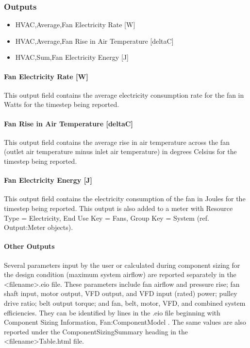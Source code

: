 \subsubsection{Outputs}\label{outputs-4-005}

\begin{itemize}
\item
  HVAC,Average,Fan Electricity Rate {[}W{]}
\item
  HVAC,Average,Fan Rise in Air Temperature {[}deltaC{]}
\item
  HVAC,Sum,Fan Electricity Energy {[}J{]}
\end{itemize}

\paragraph{Fan Electricity Rate {[}W{]}}\label{fan-electric-power-w-4}

This output field contains the average electricity consumption rate for the fan in Watts for the timestep being reported.

\paragraph{Fan Rise in Air Temperature {[}deltaC{]}}\label{fan-rise-in-air-temperature-deltac-4}

This output field contains the average rise in air temperature across the fan (outlet air temperature minus inlet air temperature) in degrees Celsius for the timestep being reported.

\paragraph{Fan Electricity Energy {[}J{]}}\label{fan-electric-energy-j-4}

This output field contains the electricity consumption of the fan in Joules for the timestep being reported. This output is also added to a meter with Resource Type = Electricity, End Use Key = Fans, Group Key = System (ref. Output:Meter objects).

\paragraph{Other Outputs}\label{other-outputs}

Several parameters input by the user or calculated during component sizing for the design condition (maximum system airflow) are reported separately in the \textless{}filename\textgreater{}.eio file. These parameters include fan airflow and pressure rise; fan shaft input, motor output, VFD output, and VFD input (rated) power; pulley drive ratio; belt output torque; and fan, belt, motor, VFD, and combined system efficiencies. They can be identified by lines in the .eio file beginning with Component Sizing Information, Fan:ComponentModel . The same values are also reported under the ComponentSizingSummary heading in the \textless{}filename\textgreater{}Table.html file.
